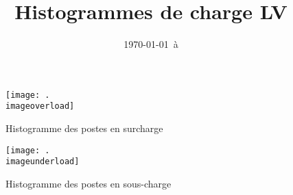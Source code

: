 \documentclass[a4paper,12pt]{article}
\title{Histogrammes de charge LV}
\date{\today\ à \DTMcurrenttime}
\begin{document}
\maketitle

\begin{figure}
    \caption{Histogramme des postes en surcharge}
    \centering
    \texttt{[image: .\\imageoverload]}
\end{figure}

\begin{figure}
    \caption{Histogramme des postes en sous-charge}
    \centering
    \texttt{[image: .\\imageunderload]}
\end{figure}
\end{document}
